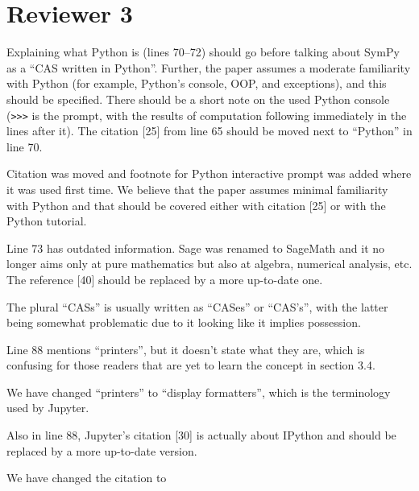 \documentclass[answers,12pt]{exam}
\begin{document}
\section{Reviewer 3}

\begin{questions}

\question Explaining what Python is (lines 70--72) should go before talking about SymPy as a ``CAS written in Python''. Further, the paper assumes a moderate familiarity with Python (for example, Python's console, OOP, and exceptions), and this should be specified. There should be a short note on the used Python console (\texttt{>>>} is the prompt, with the results of computation following immediately in the lines after it). The citation [25] from line 65 should be moved next to ``Python'' in line 70.
\begin{solution}
Citation was moved and footnote for Python interactive prompt was
added where it was used first time.
We believe that the paper assumes minimal familiarity with Python and
that should be covered either with citation [25] or with the Python tutorial.
\end{solution}

\question Line 73 has outdated information. Sage was renamed to SageMath and it no longer aims only at pure mathematics but also at algebra, numerical analysis, etc. The reference [40] should be replaced by a more up-to-date one.
\begin{solution}

\end{solution}

\question The plural ``CASs'' is usually written as ``CASes'' or ``CAS's'', with the latter being somewhat problematic due to it looking like it implies possession.
\begin{solution}
\end{solution}

\question Line 88 mentions ``printers'', but it doesn't state what they are, which is confusing for those readers that are yet to learn the concept in section 3.4.
\begin{solution}
We have changed ``printers'' to ``display formatters'', which is the
terminology used by Jupyter.
\end{solution}

\question Also in line 88, Jupyter's citation [30] is actually about IPython and should be replaced by a more up-to-date version.
\begin{solution}
We have changed the citation to


\end{solution}
\end{questions}
\end{document}
